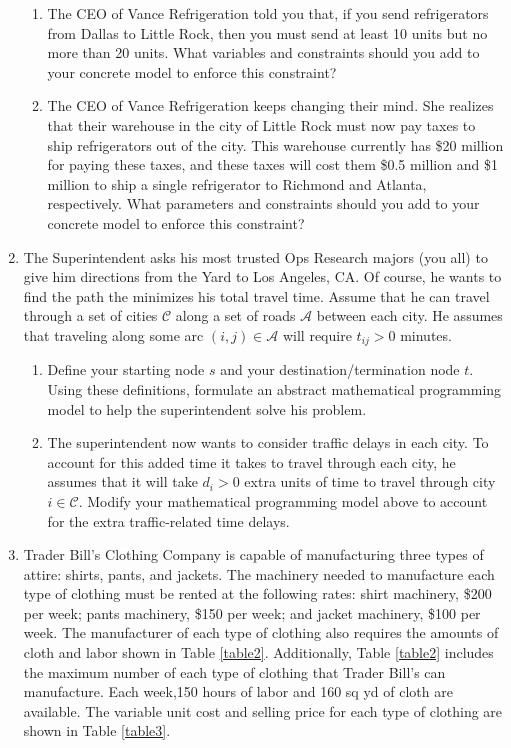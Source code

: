 \begin{enumerate}
\begin{enumerate}
\item The CEO of Vance Refrigeration told you that, if you send refrigerators from Dallas to Little Rock, then you must send at least 10 units but no more than 20 units. What variables and constraints should you add to your concrete model to enforce this constraint?
\vspace{7cm}
\item The CEO of Vance Refrigeration keeps changing their mind. She realizes that their warehouse in the city of Little Rock must now pay taxes to ship refrigerators out of the city. This warehouse currently has \$20 million for paying these taxes, and these taxes will cost them \$0.5 million and \$1 million to ship a single refrigerator to Richmond and Atlanta, respectively. What parameters and constraints should you add to your concrete model to enforce this constraint?
\end{enumerate}


\newpage
\item The Superintendent asks his most trusted Ops Research majors (you all) to give him directions from the Yard to Los Angeles, CA. Of course, he wants to find the path the minimizes his total travel time. Assume that he can travel through a set of cities $\mathcal{C}$ along a set of roads $\mathcal{A}$ between each city. He assumes that traveling along some arc $(i,j) \in \mathcal{A}$ will require $t_{ij} > 0$ minutes.  


\begin{enumerate}

\item Define your starting node $s$ and your destination/termination node $t$. Using these definitions, formulate an abstract mathematical programming model to help the superintendent solve his problem.

\vspace{11cm}

\item The superintendent now wants to consider traffic delays in each city. To account for this added time it takes to travel through each city, he assumes that it will take $d_i > 0$ extra units of time to travel through city $i \in \mathcal{C}$. Modify your mathematical programming model above to account for the extra traffic-related time delays.
\end{enumerate}

\newpage

\item Trader Bill's Clothing Company is capable of manufacturing three types of attire: shirts, pants, and jackets. The machinery needed to manufacture each type of clothing must be rented at the following rates: shirt machinery, \$200 per week; pants machinery, \$150 per week; and jacket machinery, \$100 per week. The manufacturer of each type of clothing also requires the amounts of cloth and labor shown in Table \ref{table2}. Additionally, Table \ref{table2} includes the maximum number of each type of clothing that Trader Bill's can manufacture. Each week,150 hours of labor and 160 sq yd of cloth are available. The variable unit cost and selling price for each type of clothing are shown in Table \ref{table3}.



\end{enumerate}
